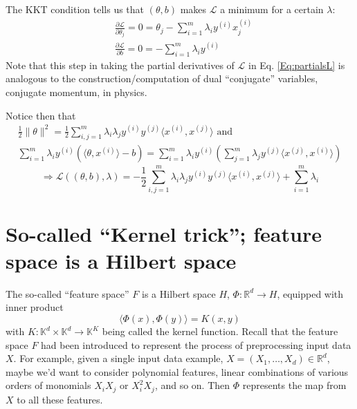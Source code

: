 \documentclass[10pt]{amsart}
\begin{document}
\begin{multicols*}{2}
The KKT condition tells us that $(\theta,b)$ makes $\mathcal{L}$ a minimum for a certain $\lambda$:
\begin{equation}\label{Eq:partialsL}
  \begin{aligned}
    & \frac{ \partial \mathcal{L}}{ \partial \theta_j} = 0 = \theta_j - \sum_{i=1}^m \lambda_i y^{(i)} x_j^{(i)} \\ 
    & \frac{ \partial \mathcal{L}}{ \partial b} = 0 = -\sum_{i=1}^m \lambda_i y^{(i)}
    \end{aligned}
  \end{equation}
Note that this step in taking the partial derivatives of $\mathcal{L}$ in Eq. \ref{Eq:partialsL} is analogous to the construction/computation of dual ``conjugate'' variables, conjugate momentum, in physics.  

Notice then that
\begin{equation}
  \begin{gathered} \frac{1}{2} \| \theta \|^2 = \frac{1}{2} \sum_{i,j=1}^m \lambda_i \lambda_j y^{(i)} y^{(j)} \langle x^{(i)}, x^{(j)} \rangle \text{ and } \\
    \sum_{i=1}^m \lambda_i y^{(i)} (\langle \theta, x^{(i)} \rangle -b ) =\sum_{i=1}^m \lambda_i y^{(i)} (\sum_{j=1}^m \lambda_j y^{(j)} \langle x^{(j)}, x^{(i)} \rangle )
    \end{gathered}
  \end{equation}
\begin{equation}
\Longrightarrow \mathcal{L}((\theta,b),\lambda) = -\frac{1}{2} \sum_{i,j=1}^m \lambda_i \lambda_j y^{(i)} y^{(j)} \langle x^{(i)} , x^{(j)} \rangle + \sum_{i=1}^m \lambda_i
\end{equation}

\section{So-called ``Kernel trick''; feature space is a Hilbert space}

The so-called ``feature space'' $F$ is a Hilbert space $H$, $\Phi:\mathbb{R}^d \to H$, equipped with inner product
\begin{equation}
\langle \Phi(x), \Phi(y) \rangle = K(x,y)
  \end{equation}
with $K: \mathbb{K}^d\times \mathbb{K}^d \to \mathbb{K}^K$ being called the kernel function.  Recall that the feature space $F$ had been introduced to represent the process of preprocessing input data $X$.  For example, given a single input data example, $X=(X_1,\dots, X_d)\in \mathbb{R}^d$, maybe we'd want to consider polynomial features, linear combinations of various orders of monomials $X_iX_j$ or $X_i^2 X_j$, and so on.  Then $\Phi$ represents the map from $X$ to all these features.


\end{multicols*}
\end{document}
